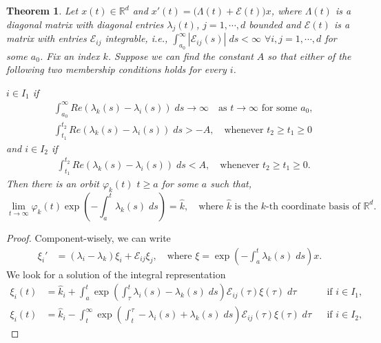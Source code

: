 \documentclass[a4paper,11pt]{article}
\newtheorem{theorem}{Theorem}
\theoremstyle{remark}
\begin{document}
{\begin{theorem}{\cite[Diagonal Version]{CL1955}}\label{thm:CL} Let $x(t)\in \mathbb{R}^d$ and $x'(t) = \big(\Lambda(t) + \mathcal{E}(t)\big)x$, where $\Lambda(t)$ is a diagonal matrix with diagonal entries $\lambda_j(t)$, $j=1,\cdots,d$ bounded and $\mathcal{E}(t)$ is a matrix with entries $\mathcal{E}_{ij}$ integrable, i.e., $\int_{a_0}^\infty |\mathcal{E}_{ij}(s)|\; ds < \infty$ $\forall i,j=1,\cdots,d$ for some $a_0$.
Fix an index $k$. Suppose we can find the constant $A$ so that either of the following two membership conditions holds for every $i$.

$i \in I_1$ if
\begin{align}
 &\int_{a_0}^\infty Re(\lambda_k(s) -\lambda_i(s))\; ds \rightarrow \infty \quad \text{as $t \rightarrow \infty$ for some $a_0$},\label{eq:I1cond1}\\
 &\int_{t_1}^{t_2} Re(\lambda_k(s) -\lambda_i(s))\; ds > -A, \quad \text{whenever $t_2\ge t_1\ge 0$} \label{eq:I1cond2}
\end{align}
and $i \in I_2$ if
\begin{align}
 &\int_{t_1}^{t_2} Re(\lambda_k(s) -\lambda_i(s))\; ds < A, \quad \text{whenever $t_2\ge t_1\ge 0$}. \label{eq:I2cond}
\end{align}
Then there is an orbit $\varphi_k(t)$ $t\ge a$ for some $a$ such that,
\begin{equation}
 \lim_{t \rightarrow \infty} \varphi_k(t) \exp\left(-\int_{a}^t \lambda_k(s)\; ds\right) = \hat{k}, \quad \text{where $\hat{k}$ is the $k$-th coordinate basis of $\mathbb{R}^d$.}
\end{equation}
\end{theorem}
\begin{proof}
Component-wisely, we can write
\begin{align*}
 \xi_i' & = (\lambda_i-\lambda_k)\xi_i + \mathcal{E}_{ij}\xi_j, \quad \text{where $\xi = \exp\left(-\int_a^t \lambda_k(s) \; ds\right)x$.}
\end{align*}
We look for a solution of the integral representation
\begin{align*}
 \xi_i(t) &= \hat{k}_i + \int_a^t \exp\left(\int_\tau^t \lambda_i(s)-\lambda_k(s) \; ds\right)\mathcal{E}_{ij}(\tau)\xi(\tau) \; d\tau && \text{if $i\in I_1$,}\\
 \xi_i(t) &= \hat{k}_i -\int_t^\infty \exp\left(\int_t^\tau -\lambda_i(s)+\lambda_k(s) \; ds\right)\mathcal{E}_{ij}(\tau)\xi(\tau) \; d\tau && \text{if $i\in I_2$,}

\end{align*}
\end{proof}}
\end{document}
